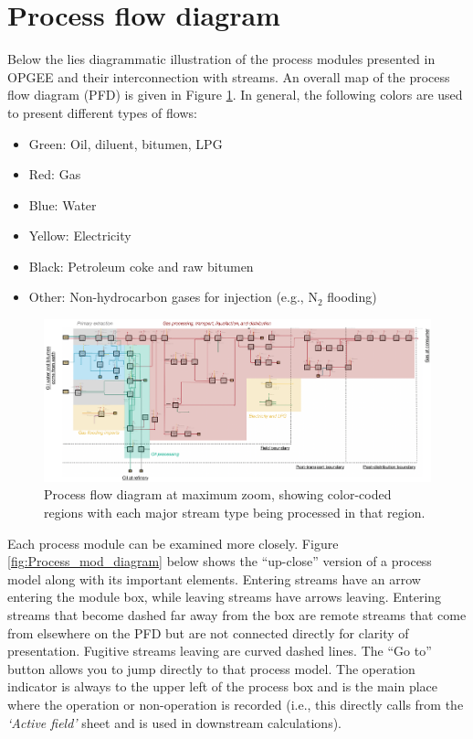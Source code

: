 \documentclass[11pt]{report}
\newcommand{\xlname}[1]{\raisebox{1pt}{\fcolorbox{light-gray}{light-gray}{\texttt{\textcolor{stanford}{\scriptsize{#1}}}}}}
\newcommand{\sheet}[1]{\textit{`{#1}'}}
\begin{document}
\section{Process flow diagram}

Below the \xlname{FlowTable} lies diagrammatic illustration of the process modules presented in OPGEE and their interconnection with streams. An overall map of the process flow diagram (PFD) is given in Figure \ref{fig:PFD_map}. In general, the following colors are used to present different types of flows:
\begin{itemize}
    \item Green: Oil, diluent, bitumen, LPG
    \item Red: Gas
    \item Blue: Water
    \item Yellow: Electricity
    \item Black: Petroleum coke and raw bitumen
    \item Other: Non-hydrocarbon gases for injection (e.g., N$_2$ flooding) 
\end{itemize}

\begin{landscape}
\begin{figure}[t]
\includegraphics[width=1\columnwidth]{images/PFD_map.pdf}
\caption{Process flow diagram at maximum zoom, showing color-coded regions with each major stream type being processed in that region.}
\label{fig:PFD_map}
\end{figure}
\end{landscape}

Each process module can be examined more closely. Figure \ref{fig:Process_mod_diagram} below shows the ``up-close'' version of a process model along with its important elements. Entering streams have an arrow entering the module box, while leaving streams have arrows leaving. Entering streams that become dashed far away from the box are remote streams that come from elsewhere on the PFD but are not connected directly for clarity of presentation. Fugitive streams leaving are curved dashed lines. The ``Go to'' button allows you to jump directly to that process model. The operation indicator is always to the upper left of the process box and is the main place where the operation or non-operation is recorded (i.e., this directly calls from the \sheet{Active field} sheet and is used in downstream calculations). 
\end{document}
